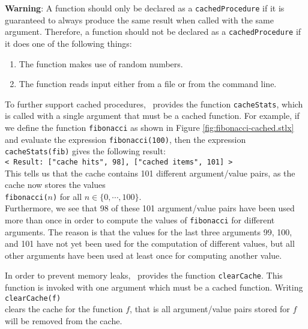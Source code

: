 \vspace*{0.3cm}

\noindent
\textbf{Warning}:  A function should only be declared as a \texttt{cachedProcedure} if it is
guaranteed to always produce the same result when called with the same argument.
Therefore, a function should not be declared as a \texttt{cachedProcedure} if it does one
of the following things:
\begin{enumerate}
\item The function makes use of random numbers.
\item The function reads input either from a file or from the command line.
\end{enumerate}
To further support cached procedures,  \setlx\ provides the function \texttt{cacheStats},
which is called with a single argument that must be a cached function.  For example, if
we define the function \texttt{fibonacci} as shown in Figure
\ref{fig:fibonacci-cached.stlx} and evaluate the expression \texttt{fibonacci(100)}, then
the expression \texttt{cacheStats(fib)} gives the following result:
\\[0.2cm]
\hspace*{1.3cm}
\texttt{< Result: {["cache hits", 98], ["cached items", 101]} >}
\\[0.2cm]
This tells us that the cache contains 101 different argument/value pairs, as the cache
now stores the values
\\[0.2cm]
\hspace*{1.3cm}
\texttt{fibonacci($n$)} \quad for all $n \in \{0,\cdots,100\}$.
\\[0.2cm]
Furthermore, we see that 98 of these 101 argument/value pairs have
been used more than once in order to
compute the values of \texttt{fibonacci} for different arguments.  The reason is that the
values for the last three arguments 99, 100, and 101 have not yet been used for the
computation of different values, but all other arguments have been used at least once for
computing another value.

In order to prevent memory leaks, \setlx\ provides the function \texttt{clearCache}.  This
function is invoked with one argument which must be a cached function.  Writing
\\[0.2cm]
\hspace*{1.3cm}
\texttt{clearCache(f)}
\\[0.2cm]
clears the cache for the function $f$, that is all argument/value pairs stored for $f$
will be removed from the cache.


